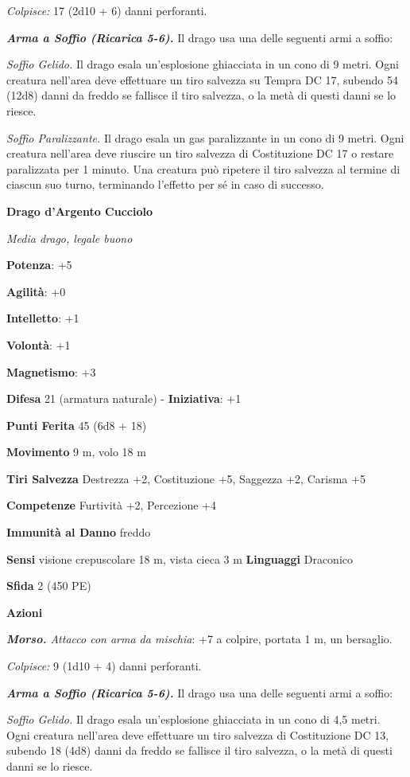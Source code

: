 \begin{multicols}{2}
\emph{Colpisce:} 17 (2d10 + 6) danni perforanti.

\emph{\textbf{Arma a Soffio (Ricarica 5-6).}} Il drago usa una delle
seguenti armi a soffio:

\emph{Soffio Gelido.} Il drago esala un'esplosione ghiacciata in un cono
di 9 metri. Ogni creatura nell'area deve effettuare un tiro salvezza su Tempra DC 17, subendo 54 (12d8) danni da freddo se fallisce il
tiro salvezza, o la metà di questi danni se lo riesce.

\emph{Soffio Paralizzante.} Il drago esala un gas paralizzante in un
cono di 9 metri. Ogni creatura nell'area deve riuscire un tiro salvezza
di Costituzione DC 17 o restare paralizzata per 1 minuto. Una creatura
può ripetere il tiro salvezza al termine di ciascun suo turno,
terminando l'effetto per sé in caso di successo.

\textbf{Drago d'Argento Cucciolo}

\emph{Media drago, legale buono}

\textbf{Potenza}: +5

\textbf{Agilità}: +0

\textbf{Intelletto}: +1

\textbf{Volontà}: +1

\textbf{Magnetismo}: +3

\textbf{Difesa} 21 (armatura naturale) - \textbf{Iniziativa}: +1

\textbf{Punti Ferita} 45 (6d8 + 18)

\textbf{Movimento} 9 m, volo 18 m

\textbf{Tiri Salvezza} Destrezza +2, Costituzione +5, Saggezza +2,
Carisma +5

\textbf{Competenze} Furtività +2, Percezione +4

\textbf{Immunità al Danno} freddo

\textbf{Sensi} visione crepuscolare 18 m, vista cieca 3 m
\textbf{Linguaggi} Draconico

\textbf{Sfida} 2 (450 PE)\smallskip

\smallskip\textbf{Azioni}

\emph{\textbf{Morso.} Attacco con arma da mischia}: +7 a colpire,
portata 1 m, un bersaglio.

\emph{Colpisce:} 9 (1d10 + 4) danni perforanti.

\emph{\textbf{Arma a Soffio (Ricarica 5-6).}} Il drago usa una delle
seguenti armi a soffio:

\emph{Soffio Gelido.} Il drago esala un'esplosione ghiacciata in un cono
di 4,5 metri. Ogni creatura nell'area deve effettuare un tiro salvezza
di Costituzione DC 13, subendo 18 (4d8) danni da freddo se fallisce il
tiro salvezza, o la metà di questi danni se lo riesce.


\end{multicols}
